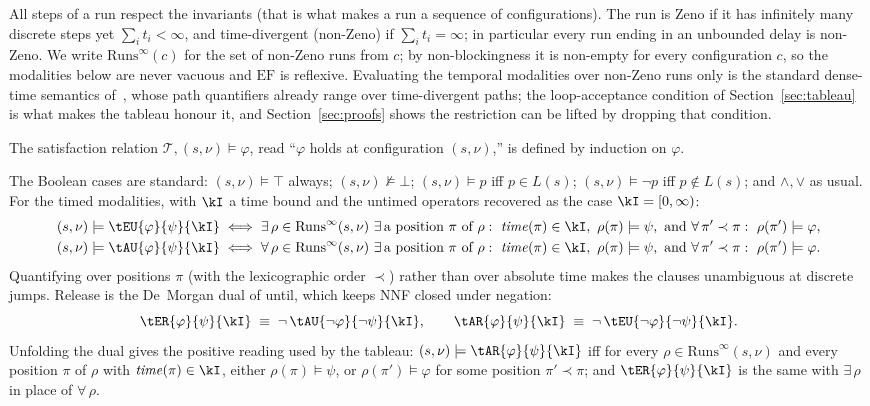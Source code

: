 All steps of a run respect the invariants (that is what makes a run a sequence of configurations). The run is {Zeno} if it has infinitely many discrete steps yet $\sum_i t_i<\infty$, and {time-divergent} ({non-Zeno}) if $\sum_i t_i=\infty$; in particular every run ending in an unbounded delay is non-Zeno. We write $\mathrm{Runs}^{\infty}(c)$ for the set of non-Zeno runs from $c$; by non-blockingness it is non-empty for every configuration $c$, so the modalities below are never vacuous and $\mathrm{EF}$ is reflexive. Evaluating the temporal modalities over non-Zeno runs only is the standard dense-time semantics of~\cite{AlurCourcoubetisDill1990}, whose path quantifiers already range over time-divergent paths; the loop-acceptance condition of Section~\ref{sec:tableau} is what makes the tableau honour it, and Section~\ref{sec:proofs} shows the restriction can be lifted by dropping that condition.

The satisfaction relation $\mathcal{T},(s,\nu)\models\varphi$, read ``$\varphi$ holds at configuration $(s,\nu)$,'' is defined by induction on $\varphi$.

\begin{definition}[Satisfaction]\label{def:sat}
The Boolean cases are standard: $(s,\nu)\models\top$ always; $(s,\nu)\not\models\bot$; $(s,\nu)\models p$ iff $p\in L(s)$; $(s,\nu)\models\neg p$ iff $p\notin L(s)$; and $\land,\lor$ as usual. For the timed modalities, with $\kI$ a time bound and the untimed operators recovered as the case $\kI=[0,\infty)$:
\begin{align*}
(s,\nu)\models \tEU{\varphi}{\psi}{\kI}
&\iff \exists\,\rho\in\mathrm{Runs}^\infty(s,\nu)\ \exists\,\text{a position }\pi\text{ of }\rho:\ \mathit{time}(\pi)\in \kI,\ \rho(\pi)\models\psi,\ \text{and}\ \forall\,\pi'\prec\pi:\ \rho(\pi')\models\varphi,\\
(s,\nu)\models \tAU{\varphi}{\psi}{\kI}
&\iff \forall\,\rho\in\mathrm{Runs}^\infty(s,\nu)\ \exists\,\text{a position }\pi\text{ of }\rho:\ \mathit{time}(\pi)\in \kI,\ \rho(\pi)\models\psi,\ \text{and}\ \forall\,\pi'\prec\pi:\ \rho(\pi')\models\varphi.
\end{align*}
Quantifying over positions $\pi$ (with the lexicographic order $\prec$) rather than over absolute time makes the clauses unambiguous at discrete jumps. Release is the De~Morgan dual of until, which keeps NNF closed under negation:
\[
\tER{\varphi}{\psi}{\kI}\;\equiv\; \neg\,\tAU{\neg\varphi}{\neg\psi}{\kI},\qquad
\tAR{\varphi}{\psi}{\kI}\;\equiv\; \neg\,\tEU{\neg\varphi}{\neg\psi}{\kI}.
\]
Unfolding the dual gives the positive reading used by the tableau: $(s,\nu)\models \tAR{\varphi}{\psi}{\kI}$ iff for {every} $\rho\in\mathrm{Runs}^\infty(s,\nu)$ and every position $\pi$ of $\rho$ with $\mathit{time}(\pi)\in \kI$, either $\rho(\pi)\models\psi$, or $\rho(\pi')\models\varphi$ for some position $\pi'\prec\pi$; and $\tER{\varphi}{\psi}{\kI}$ is the same with $\exists\,\rho$ in place of $\forall\,\rho$.
\end{definition}


